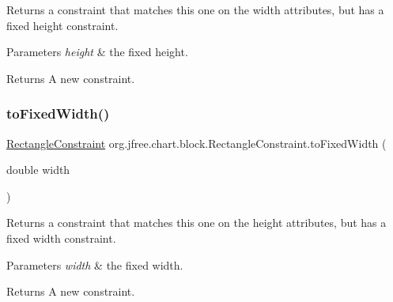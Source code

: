 Returns a constraint that matches this one on the width attributes, but has a fixed height constraint.


\begin{DoxyParams}{Parameters}
{\em height} & the fixed height.\\
\hline
\end{DoxyParams}
\begin{DoxyReturn}{Returns}
A new constraint. 
\end{DoxyReturn}
\mbox{\label{classorg_1_1jfree_1_1chart_1_1block_1_1_rectangle_constraint_a4e578fd0f0a6a793a05f02322950be10}} 
\subsubsection{\texorpdfstring{to\+Fixed\+Width()}{toFixedWidth()}}
{\footnotesize\ttfamily \mbox{\hyperlink{classorg_1_1jfree_1_1chart_1_1block_1_1_rectangle_constraint}{Rectangle\+Constraint}} org.\+jfree.\+chart.\+block.\+Rectangle\+Constraint.\+to\+Fixed\+Width (\begin{DoxyParamCaption}\item[{double}]{width }\end{DoxyParamCaption})}

Returns a constraint that matches this one on the height attributes, but has a fixed width constraint.


\begin{DoxyParams}{Parameters}
{\em width} & the fixed width.\\
\hline
\end{DoxyParams}
\begin{DoxyReturn}{Returns}
A new constraint. 
\end{DoxyReturn}
\mbox{\label{classorg_1_1jfree_1_1chart_1_1block_1_1_rectangle_constraint_a7d37313a32f867a3623dc5d9c7bc93c4}} 

